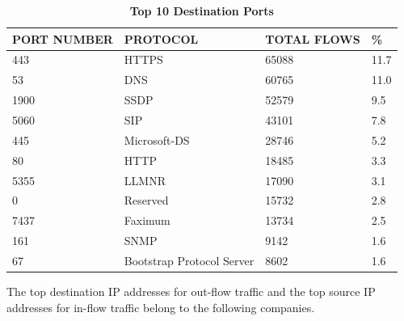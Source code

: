 \documentclass[journal]{IEEE/IEEEtran}
\begin{document}
\begin{table}[ht]
\centering
\caption{\textbf{Top 10 Destination Ports}}
\label{top-out-flows}
\begin{tabular}{|l|l|l|l|}
\hline
\textbf{PORT NUMBER}			& \textbf{PROTOCOL}			& \textbf{TOTAL FLOWS}		& \textbf{\%} 	 \\ \hline
    443							& HTTPS						&  65088					& 11.7  	     \\ \hline
    53							& DNS						&  60765        			& 11.0			 \\ \hline
    1900						& SSDP						&  52579					& 9.5			 \\ \hline
    5060						& SIP						&  43101          			& 7.8   	     \\ \hline
    445							& Microsoft-DS				&  28746           			& 5.2        	 \\ \hline
    80							& HTTP						&  18485					& 3.3         	 \\ \hline
    5355						& LLMNR						&  17090    		        & 3.1    	     \\ \hline
    0							& Reserved					&  15732		            & 2.8       	 \\ \hline
    7437						& Faximum					&  13734        		    & 2.5         	 \\ \hline
    161							& SNMP						&  9142        			    & 1.6         	 \\ \hline
    67							& Bootstrap Protocol Server	&  8602        			    & 1.6         	 \\ \hline
\end{tabular}
\end{table}


The top destination IP addresses for out-flow traffic and the top source IP addresses for in-flow traffic belong to the following companies.
\end{document}
